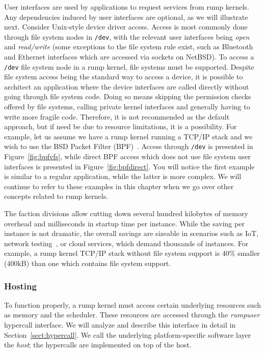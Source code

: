 User interfaces are used by applications to request services from
rump kernels.  Any dependencies induced by user interfaces
are optional, as we will illustrate next.  Consider Unix-style
device driver access.  Access is most commonly done through file
system nodes in \texttt{/dev}, with the relevant user interfaces
being \textit{open} and \textit{read/write} (some exceptions to the
file system rule exist, such as Bluetooth and Ethernet interfaces
which are accessed via sockets on NetBSD).  To access a
\texttt{/dev} file system node in a rump kernel, file systems must be
supported.  Despite file system access being the standard way to access
a device, it is possible to architect an application
where the device interfaces are called directly without going
through file system code.  Doing so means skipping the permission
checks offered by file systems, calling private kernel interfaces and
generally having to write more fragile code.  Therefore, it is not
recommended as the default approach, but if need be due to resource
limitations, it is a possibility.  For example, let us assume we
have a rump kernel running a TCP/IP stack and we wish to use the BSD
Packet Filter (BPF)~\cite{mccanne:bpf}.  Access through
\texttt{/dev} is presented in Figure~\ref{fig:bpfvfs}, while direct
BPF access which does not use file system user interfaces is
presented in Figure~\ref{fig:bpfdirect}.  You will notice the first
example is similar to a regular application, while the latter is
more complex.  We will continue to refer to these examples in this
chapter when we go over other concepts related to rump kernels.

The faction divisions allow cutting down several hundred kilobytes
of memory overhead and milliseconds in startup time per instance.
While the saving per instance is not dramatic, the overall savings
are sizeable in scenarios such as IoT, network testing~\cite{hibler:emulab},
or cloud services, which demand thousands of instances.  For example, a
rump kernel TCP/IP stack without file system support is 40\% smaller
(400kB) than one which contains file system support.

\subsubsection{Hosting}

To function properly, a rump kernel must access certain underlying resources
such as memory and the scheduler.  These resources are accessed through
the \textit{rumpuser} hypercall interface.  We will analyze and describe
this interface in detail in Section~\ref{sect:hypercall}.  We call the
underlying platform-specific software layer the \textit{host}; the hypercalls are
implemented on top of the host.

